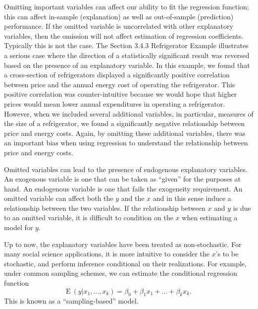 Omitting important variables can affect our ability to fit the
regression function; this can affect in-sample (explanation) as well
as out-of-sample (prediction) performance. If the omitted variable
is uncorrelated with other explanatory variables, then the omission
will not affect estimation of regression coefficients. Typically
this is not the case. The Section 3.4.3 Refrigerator Example
illustrates a serious case where the direction of a statistically
significant result was reversed based on the presence of an
explanatory variable. In this example, we found that a cross-section
of refrigerators displayed a significantly positive correlation
between price and the annual energy cost of operating the
refrigerator. This positive correlation was counter-intuitive
because we would hope that higher prices would mean lower annual
expenditures in operating a refrigerator. However, when we included
several additional variables, in particular, measures of the size of
a refrigerator, we found a significantly negative relationship
between price and energy costs. Again, by omitting these additional
variables, there was an important bias when using regression to
understand the relationship between price and energy costs.

Omitted variables can lead to the presence of endogenous explanatory
variables. An exogenous variable is one that can be taken as
``given'' for the purposes at hand.  An endogenous variable is one
that fails the exogeneity requirement. An omitted variable can
affect both the $y$ and the $x$ and in this sense induce a
relationship between the two variables. If the relationship between
$x$ and $y$ is due to an omitted variable, it is difficult to
condition on the $x$ when estimating a model for $y$.

Up to now, the explanatory variables have been treated as
non-stochastic. For many social science applications, it is more
intuitive to consider the $x$'s to be stochastic, and perform
inference conditional on their realizations. For example, under
common sampling schemes, we can estimate the conditional regression
function
\begin{equation*}
\mathrm{E~}\left(y|x_1, \ldots, x_k \right) = \beta_0 + \beta_1 x_1
+ \ldots + \beta_k x_k .
\end{equation*}
This is known as a ``sampling-based'' model.

